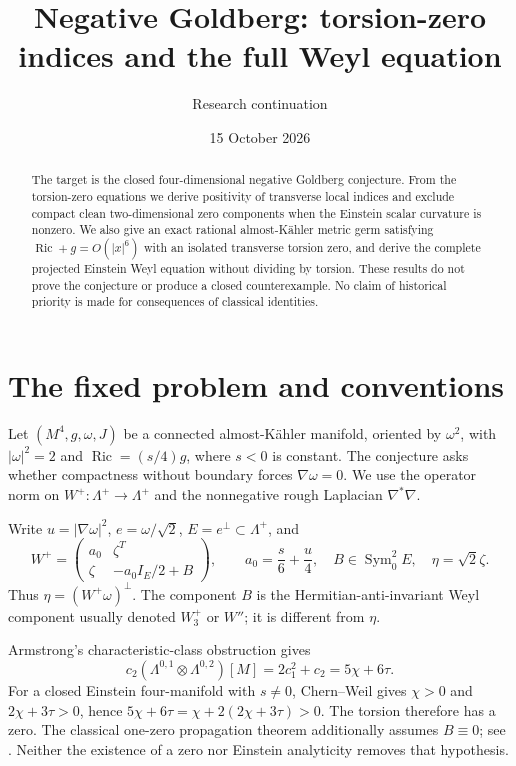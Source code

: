 \documentclass[11pt]{article}
\title{Negative Goldberg: torsion-zero indices and the full Weyl equation}
\author{Research continuation}
\date{15 October 2026}
\newcommand{\Ric}{\operatorname{Ric}}
\newcommand{\Sym}{\operatorname{Sym}}
\begin{document}
\maketitle
\begin{abstract}
The target is the closed four-dimensional negative Goldberg conjecture. From the torsion-zero equations we derive positivity of transverse local indices and exclude compact clean two-dimensional zero components when the Einstein scalar curvature is nonzero. We also give an exact rational almost-K\"ahler metric germ satisfying $\Ric+g=O(|x|^6)$ with an isolated transverse torsion zero, and derive the complete projected Einstein Weyl equation without dividing by torsion. These results do not prove the conjecture or produce a closed counterexample. No claim of historical priority is made for consequences of classical identities.
\end{abstract}

\section{The fixed problem and conventions}
Let $(M^4,g,\omega,J)$ be a connected almost-K\"ahler manifold, oriented by $\omega^2$, with $|\omega|^2=2$ and $\Ric=(s/4)g$, where $s<0$ is constant. The conjecture asks whether compactness without boundary forces $\nabla\omega=0$. We use the operator norm on $W^+:\Lambda^+\to\Lambda^+$ and the nonnegative rough Laplacian $\nabla^*\nabla$.

Write $u=|\nabla\omega|^2$, $e=\omega/\sqrt2$, $E=e^\perp\subset\Lambda^+$, and
\begin{equation}\label{block}
W^+=\begin{pmatrix}a_0&\zeta^T\\\zeta&-a_0I_E/2+B\end{pmatrix},\qquad
 a_0=\frac{s}{6}+\frac{u}{4},\quad B\in\Sym^2_0E,\quad \eta=\sqrt2\zeta.
\end{equation}
Thus $\eta=(W^+\omega)^\perp$. The component $B$ is the Hermitian-anti-invariant Weyl component usually denoted $W_3^+$ or $W''$; it is different from $\eta$.

Armstrong's characteristic-class obstruction gives
\begin{equation}\label{chern}
c_2(\Lambda^{0,1}\otimes\Lambda^{0,2})[M]
=2c_1^2+c_2=5\chi+6\tau.
\end{equation}
For a closed Einstein four-manifold with $s\ne0$, Chern--Weil gives $\chi>0$ and $2\chi+3\tau>0$, hence $5\chi+6\tau=\chi+2(2\chi+3\tau)>0$. The torsion therefore has a zero. The classical one-zero propagation theorem additionally assumes $B\equiv0$; see \cite[Theorem 3 and the preceding argument]{AD}. Neither the existence of a zero nor Einstein analyticity removes that hypothesis.
\end{document}
